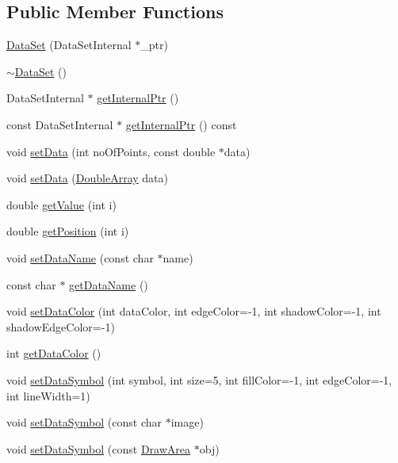 \subsection*{Public Member Functions}
\begin{DoxyCompactItemize}
\item 
\hyperlink{class_data_set_a142cf87cf1c386949feddf19d446a19a}{Data\+Set} (Data\+Set\+Internal $\ast$\+\_\+ptr)
\item 
\hyperlink{class_data_set_a2cdb84d32331956b413ca36933e516bd}{$\sim$\+Data\+Set} ()
\item 
Data\+Set\+Internal $\ast$ \hyperlink{class_data_set_a4901f101afedfe65f10d2a28817ffafd}{get\+Internal\+Ptr} ()
\item 
const Data\+Set\+Internal $\ast$ \hyperlink{class_data_set_af4de1e342c382b3e2b3c3013622d2831}{get\+Internal\+Ptr} () const
\item 
void \hyperlink{class_data_set_a05a36bed4b2e5d0ad7bc7d6f44507f0c}{set\+Data} (int no\+Of\+Points, const double $\ast$data)
\item 
void \hyperlink{class_data_set_a059176a28d82a9524ff8b4687becd719}{set\+Data} (\hyperlink{class_double_array}{Double\+Array} data)
\item 
double \hyperlink{class_data_set_aa6fb7ec40666c6773515831ebcb6235e}{get\+Value} (int i)
\item 
double \hyperlink{class_data_set_aa514c7c8f77b54a6fbf5d29d4af2c25e}{get\+Position} (int i)
\item 
void \hyperlink{class_data_set_a9a6419f8f676068219d9b55c45eb19c2}{set\+Data\+Name} (const char $\ast$name)
\item 
const char $\ast$ \hyperlink{class_data_set_aad74ac46262111ed71cf8811606f5b78}{get\+Data\+Name} ()
\item 
void \hyperlink{class_data_set_ab01844c74951ca54d064d3dcafd55310}{set\+Data\+Color} (int data\+Color, int edge\+Color=-\/1, int shadow\+Color=-\/1, int shadow\+Edge\+Color=-\/1)
\item 
int \hyperlink{class_data_set_a7b870af5d707224a3a9953c5362ab0bf}{get\+Data\+Color} ()
\item 
void \hyperlink{class_data_set_aa9edb7443935eb5f07f7d70b7f65656d}{set\+Data\+Symbol} (int symbol, int size=5, int fill\+Color=-\/1, int edge\+Color=-\/1, int line\+Width=1)
\item 
void \hyperlink{class_data_set_ab14487760622f6bd001c2dda7bb90e95}{set\+Data\+Symbol} (const char $\ast$image)
\item 
void \hyperlink{class_data_set_a913fa7d64fdda81c223a087fdf385465}{set\+Data\+Symbol} (const \hyperlink{class_draw_area}{Draw\+Area} $\ast$obj)

\end{DoxyCompactItemize}
